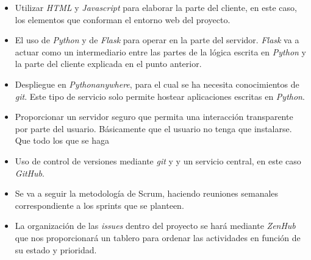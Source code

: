 \begin{itemize}
	\item Utilizar \textit{HTML} y \textit{Javascript} para elaborar la parte del cliente, en este caso, los elementos que conforman el entorno web del proyecto.
	
	\item El uso de \textit{Python} y de \textit{Flask} para operar en la parte del servidor. \textit{Flask} va a actuar como un intermediario entre las partes de la lógica escrita en \textit{Python} y la parte del cliente explicada en el punto anterior.
	
	\item Despliegue en \textit{Pythonanywhere}, para el cual se ha necesita conocimientos de \textit{git}. Este tipo de servicio solo permite hostear aplicaciones escritas en \textit{Python}.
	
	\item Proporcionar un servidor seguro que permita una interacción transparente por parte del usuario. Básicamente que el usuario no tenga que instalarse. Que todo los que se haga
	
	\item Uso de control de versiones mediante \textit{git} y y un servicio central, en este caso \textit{GitHub}.
	
	\item Se va a seguir la metodología de Scrum, haciendo reuniones semanales correspondiente a los sprints que se planteen. 
	
	\item La organización de las \textit{issues} dentro del proyecto se hará mediante \textit{ZenHub} que nos proporcionará un tablero para ordenar las actividades en función de su estado y prioridad.
\end{itemize}
